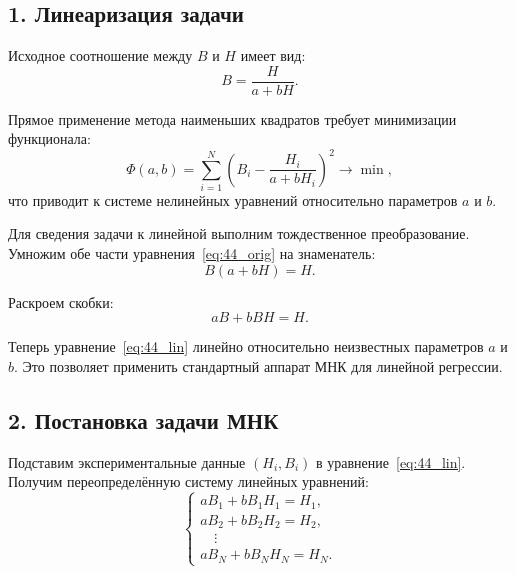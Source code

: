 \documentclass{article}
\begin{document}
\subsection*{1. Линеаризация задачи}

Исходное соотношение между $B$ и $H$ имеет вид:
\begin{equation}
B = \frac{H}{a + bH}.
\label{eq:44_orig}
\end{equation}

Прямое применение метода наименьших квадратов требует минимизации функционала:
\begin{equation}
\Phi(a, b) = \sum_{i=1}^{N} \left(B_i - \frac{H_i}{a + bH_i}\right)^2 \to \min,
\end{equation}
что приводит к системе нелинейных уравнений относительно параметров $a$ и $b$.

Для сведения задачи к линейной выполним тождественное преобразование. Умножим обе части уравнения~\eqref{eq:44_orig} на знаменатель:
\begin{equation}
B(a + bH) = H.
\end{equation}

Раскроем скобки:
\begin{equation}
aB + bBH = H.
\label{eq:44_lin}
\end{equation}

Теперь уравнение~\eqref{eq:44_lin} линейно относительно неизвестных параметров $a$ и $b$. Это позволяет применить стандартный аппарат МНК для линейной регрессии.

\subsection*{2. Постановка задачи МНК}

Подставим экспериментальные данные $(H_i, B_i)$ в уравнение~\eqref{eq:44_lin}. Получим переопределённую систему линейных уравнений:
\begin{equation}
\begin{cases}
a B_1 + b B_1 H_1 = H_1, \\
a B_2 + b B_2 H_2 = H_2, \\
\quad \vdots \\
a B_N + b B_N H_N = H_N.
\end{cases}
\end{equation}
\end{document}
